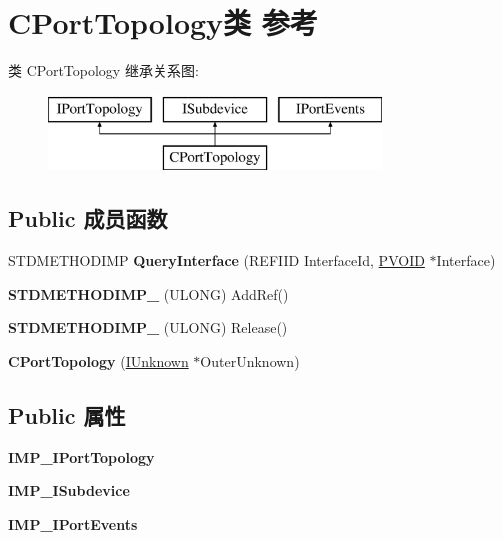 \hypertarget{class_c_port_topology}{}\section{C\+Port\+Topology类 参考}
\label{class_c_port_topology}
类 C\+Port\+Topology 继承关系图\+:\begin{figure}[H]
\begin{center}
\leavevmode
\includegraphics[height=2.000000cm]{class_c_port_topology}
\end{center}
\end{figure}
\subsection*{Public 成员函数}
\begin{DoxyCompactItemize}
\item 
\mbox{\label{class_c_port_topology_a76417a0c3f11405bfaa4d647be39407b}} 
S\+T\+D\+M\+E\+T\+H\+O\+D\+I\+MP {\bfseries Query\+Interface} (R\+E\+F\+I\+ID Interface\+Id, \hyperlink{interfacevoid}{P\+V\+O\+ID} $\ast$Interface)
\item 
\mbox{\label{class_c_port_topology_a71f2e021b2f9fb55d95a39d33b748516}} 
{\bfseries S\+T\+D\+M\+E\+T\+H\+O\+D\+I\+M\+P\+\_\+} (U\+L\+O\+NG) Add\+Ref()
\item 
\mbox{\label{class_c_port_topology_a0f78fb25ef8891dca39573ca53f24529}} 
{\bfseries S\+T\+D\+M\+E\+T\+H\+O\+D\+I\+M\+P\+\_\+} (U\+L\+O\+NG) Release()
\item 
\mbox{\label{class_c_port_topology_a4a777a0303e392d3a70bbcd939282293}} 
{\bfseries C\+Port\+Topology} (\hyperlink{interface_i_unknown}{I\+Unknown} $\ast$Outer\+Unknown)
\end{DoxyCompactItemize}
\subsection*{Public 属性}
\begin{DoxyCompactItemize}
\item 
\mbox{\label{class_c_port_topology_a78cae5d8286177462d398e2a43be4da8}} 
{\bfseries I\+M\+P\+\_\+\+I\+Port\+Topology}
\item 
\mbox{\label{class_c_port_topology_a75060503447277f8ce4d354bc0a76ddb}} 
{\bfseries I\+M\+P\+\_\+\+I\+Subdevice}
\item 
\mbox{\label{class_c_port_topology_af31f2501ede899acabba884dfe5bfff3}} 
{\bfseries I\+M\+P\+\_\+\+I\+Port\+Events}
\end{DoxyCompactItemize}
